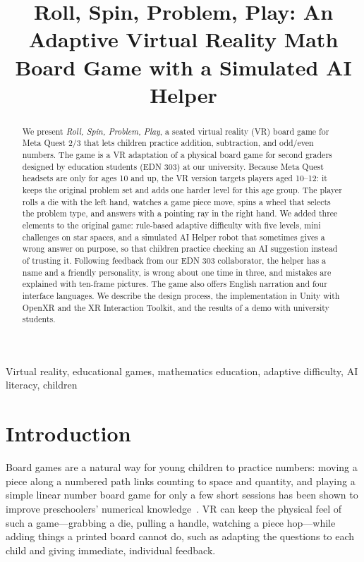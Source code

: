 \documentclass[conference]{IEEEtran}
\begin{document}
\title{Roll, Spin, Problem, Play: An Adaptive Virtual Reality Math Board Game with a Simulated AI Helper}

\author{
}

\maketitle

\begin{abstract}
We present \emph{Roll, Spin, Problem, Play}, a seated virtual reality (VR) board game for Meta Quest 2/3 that lets children practice addition, subtraction, and odd/even numbers. The game is a VR adaptation of a physical board game for second graders designed by education students (EDN 303) at our university. Because Meta Quest headsets are only for ages 10 and up, the VR version targets players aged 10--12: it keeps the original problem set and adds one harder level for this age group. The player rolls a die with the left hand, watches a game piece move, spins a wheel that selects the problem type, and answers with a pointing ray in the right hand. We added three elements to the original game: rule-based adaptive difficulty with five levels, mini challenges on star spaces, and a simulated AI Helper robot that sometimes gives a wrong answer on purpose, so that children practice checking an AI suggestion instead of trusting it. Following feedback from our EDN 303 collaborator, the helper has a name and a friendly personality, is wrong about one time in three, and mistakes are explained with ten-frame pictures. The game also offers English narration and four interface languages. We describe the design process, the implementation in Unity with OpenXR and the XR Interaction Toolkit, and the results of a demo with university students.
\end{abstract}

\begin{IEEEkeywords}
Virtual reality, educational games, mathematics education, adaptive difficulty, AI literacy, children
\end{IEEEkeywords}

\section{Introduction}
Board games are a natural way for young children to practice numbers: moving a piece along a numbered path links counting to space and quantity, and playing a simple linear number board game for only a few short sessions has been shown to improve preschoolers' numerical knowledge~\cite{siegler2008}. VR can keep the physical feel of such a game---grabbing a die, pulling a handle, watching a piece hop---while adding things a printed board cannot do, such as adapting the questions to each child and giving immediate, individual feedback.
\end{document}
